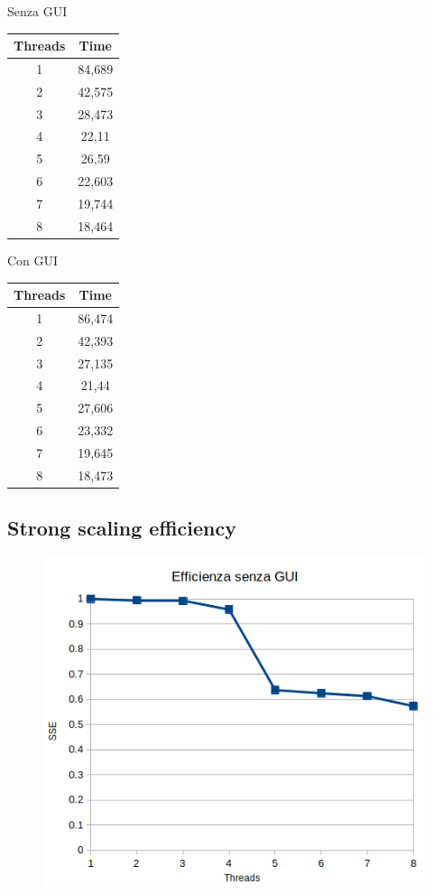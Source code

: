 \documentclass[12pt,a4paper,oneside]{article}
\begin{document}
	\hfill
	\begin{minipage}{.4\textwidth}
		Senza GUI

		\begin{tabular}{|c|c|}
			\hline
			\textbf{Threads} & \textbf{Time} \\ \hline
			1 & 84,689 \\ \hline
			2 & 42,575 \\ \hline
			3 & 28,473 \\ \hline
			4 & 22,11 \\ \hline
			5 & 26,59 \\ \hline
			6 & 22,603 \\ \hline
			7 & 19,744 \\ \hline
			8 & 18,464 \\ \hline
		\end{tabular}
	\end{minipage}
	\hfill
	\begin{minipage}{.4\textwidth}
		Con GUI

		\begin{tabular}{|c|c|}
			\hline
			\textbf{Threads} & \textbf{Time} \\ \hline
			1 & 86,474 \\ \hline
			2 & 42,393 \\ \hline
			3 & 27,135 \\ \hline
			4 & 21,44 \\ \hline
			5 & 27,606 \\ \hline
			6 & 23,332 \\ \hline
			7 & 19,645 \\ \hline
			8 & 18,473 \\ \hline
		\end{tabular}
	\end{minipage}
	
	\subsection{Strong scaling efficiency}
	\begin{figure}[!ht]
		\centering
		\includegraphics[width=0.7\linewidth]{sse-no-gui}
		\caption{}
		\label{fig:sse-no-gui}
	\end{figure}
	
\end{document}
